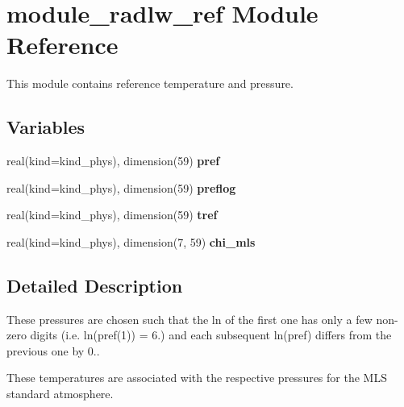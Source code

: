 \hypertarget{namespacemodule__radlw__ref}{}\section{module\+\_\+radlw\+\_\+ref Module Reference}
\label{namespacemodule__radlw__ref}


This module contains reference temperature and pressure.  


\subsection*{Variables}
\begin{DoxyCompactItemize}
\item 
\mbox{\label{namespacemodule__radlw__ref_adda97d9a274bef59507633a3fc5a0e78}} 
real(kind=kind\+\_\+phys), dimension(59) {\bfseries pref}
\item 
\mbox{\label{namespacemodule__radlw__ref_a4206f7320b6f1b59eb0132326263d2e4}} 
real(kind=kind\+\_\+phys), dimension(59) {\bfseries preflog}
\item 
\mbox{\label{namespacemodule__radlw__ref_a56972f3948052e8b7f4717c192fc551d}} 
real(kind=kind\+\_\+phys), dimension(59) {\bfseries tref}
\item 
\mbox{\label{namespacemodule__radlw__ref_adc2bbd1ac0178afda84e74ad45404d31}} 
real(kind=kind\+\_\+phys), dimension(7, 59) {\bfseries chi\+\_\+mls}
\end{DoxyCompactItemize}


\subsection{Detailed Description}

\begin{DoxyItemize}
\item These pressures are chosen such that the ln of the first one has only a few non-\/zero digits (i.\+e. ln(pref(1)) = 6.) and each subsequent ln(pref) differs from the previous one by 0..
\item These temperatures are associated with the respective pressures for the M\+LS standard atmosphere. 
\end{DoxyItemize}